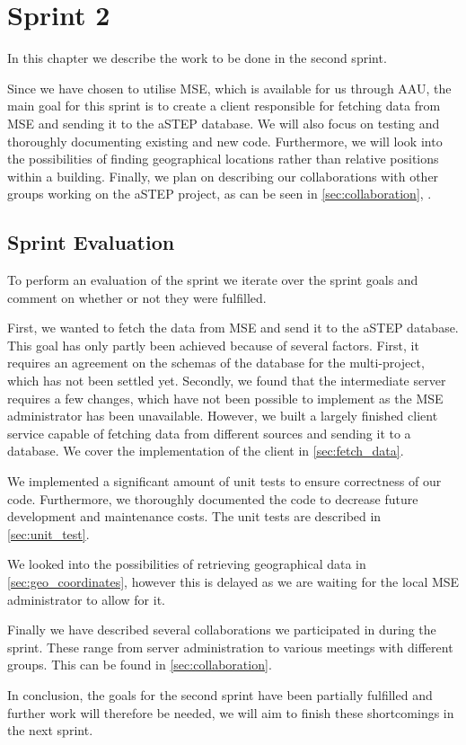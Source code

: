 \chapter{Sprint 2} \label{cha:sprint2}
In this chapter we describe the work to be done in the second sprint. 

Since we have chosen to utilise MSE, which is available for us through AAU, the main goal for this sprint is to create a client responsible for fetching data from MSE and sending it to the aSTEP database. We will also focus on testing and thoroughly documenting existing and new code. Furthermore, we will look into the possibilities of finding geographical locations rather than relative positions within a building. Finally, we plan on describing our collaborations with other groups working on the aSTEP project, as can be seen in \cref{sec:collaboration}, .





\section{Sprint Evaluation}\label{sec:s2_eval}
To perform an evaluation of the sprint we iterate over the sprint goals and comment on whether or not they were fulfilled.

First, we wanted to fetch the data from MSE and send it to the aSTEP database. This goal has only partly been achieved because of several factors. First, it requires an agreement on the schemas of the database for the multi-project, which has not been settled yet. Secondly, we found that the intermediate server requires a few changes, which have not been possible to implement as the MSE administrator has been unavailable. However, we built a largely finished client service capable of fetching data from different sources and sending it to a database. We cover the implementation of the client in \cref{sec:fetch_data}.

We implemented a significant amount of unit tests to ensure correctness of our code. Furthermore, we thoroughly documented the code to decrease future development and maintenance costs. The unit tests are described in \cref{sec:unit_test}.

We looked into the possibilities of retrieving geographical data in \cref{sec:geo_coordinates}, however this is delayed as we are waiting for the local MSE administrator to allow for it.

Finally we have described several collaborations we participated in during the sprint. These range from server administration to various meetings with different groups. This can be found in \cref{sec:collaboration}. 

In conclusion, the goals for the second sprint have been partially fulfilled and further work will therefore be needed, we will aim to finish these shortcomings in the next sprint.